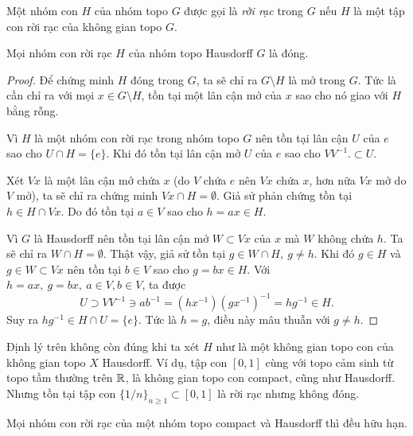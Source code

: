 \begin{defn}
    Một nhóm con $H$ của nhóm topo $G$ được gọi là \textit{rời rạc} trong $G$ nếu $H$ là một tập con rời rạc của không gian topo $G$.
\end{defn}
\begin{thm}\label{thm 1.1.11}
    Mọi nhóm con rời rạc $H$ của nhóm topo Hausdorff $G$ là đóng.
\end{thm}
\begin{proof}
    Để chứng minh $H$ đóng trong $G$, ta sẽ chỉ ra $G\setminus H$ là mở trong $G$. Tức là cần chỉ ra với mọi $x \in G\setminus H$, tồn tại một lân cận mở của $x$ sao cho nó giao với $H$ bằng rỗng.
    
    Vì $H$ là một nhóm con rời rạc trong nhóm topo $G$ nên tồn tại lân cận $U$ của $e$ sao cho $U \cap H = \{e\}$. Khi đó tồn tại lân cận mở $U$ của $e$ sao cho $VV^{-1}. \subset U$. 
    
    Xét $Vx$ là một lân cận mở chứa $x$ (do $V$ chứa $e$ nên $Vx$ chứa $x$, hơn nữa $Vx$ mở do $V$ mở), ta sẽ chỉ ra chứng minh $Vx\cap H = \emptyset$. Giả sử phản chứng tồn tại $h \in H\cap Vx$. Do đó tồn tại $a \in V$ sao cho $h = ax \in H$.
    
    Vì $G$ là Hausdorff nên tồn tại lân cận mở $W \subset Vx$ của $x$ mà $W$ không chứa $h$. Ta sẽ chỉ ra $W \cap H = \emptyset$.  
    Thật vậy, giả sử tồn tại $g \in W \cap H,~g\neq h$. Khi đó $g \in H$ và $g \in W\subset Vx$ nên tồn tại $b \in V$ sao cho $g = bx \in H$.
    Với $h =ax,~g = bx,~a\in V, b\in V$, ta được
    \[U \supset VV^{-1} \ni ab^{-1} = (hx^{-1})(gx^{-1})^{-1} = hg^{-1} \in H.\]
    Suy ra $hg^{-1} \in H \cap U = \{e\}$. Tức là $h = g$, điều này mâu thuẫn với $g \neq h$.
\end{proof}
\begin{comment*}
    Định lý trên không còn đúng khi ta xét $H$ như là một không gian topo con của không gian topo $X$ Hausdorff. Ví dụ, tập con $[0,1]$ cùng với topo cảm sinh từ topo tầm thường trên $\R$, là không gian topo con compact, cũng như Hausdorff.  Nhưng tồn tại tập con $\{1/n\}_{n\geq 1} \subset [0,1]$ là rời rạc nhưng không đóng.
\end{comment*}
\begin{cor}\label{cor 1.1.12}
    Mọi nhóm con rời rạc của một nhóm topo compact và Hausdorff thì đều hữu hạn.
\end{cor}
